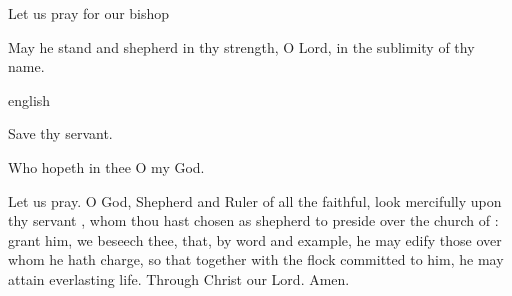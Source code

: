 \begin{enpars} \noindent
\vv Let us pray for our bishop \nomen

\noindent
\rr May he stand and shepherd in thy strength, O Lord, in the sublimity of thy name.
\end{enpars}

{english}
{\noindent \vv Save thy servant.

\noindent \rr Who hopeth in thee O my God.

\noindent Let us pray. O God, Shepherd and Ruler of all the faithful, look mercifully upon thy servant \nomen, whom thou hast chosen as shepherd to preside over the church of \nomen: grant him, we beseech thee, that, by word and example, he may edify those over whom he hath charge, so that together with the flock committed to him, he may attain everlasting life. Through Christ our Lord. Amen.}